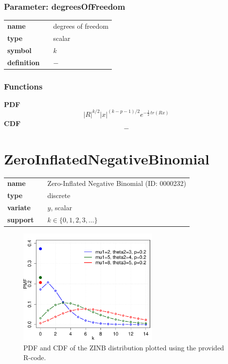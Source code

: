 \subsubsection*{Parameter: degreesOfFreedom}

\noindent\begin{tabular}{p{2cm}cl}
\textbf{name} & & degrees of freedom \\
\textbf{type} & & scalar \\
\textbf{symbol} & & $k$  \\
\textbf{definition} & & $-$
\end{tabular}
\subsubsection*{Functions}

\smallskip \noindent \hspace{.2cm} \textbf{PDF} 
\begin{equation*}|R|^{k/2}|x|^{(k-p-1)/2}e^{-\frac{1}2\,tr(Rx)}\end{equation*}
\smallskip \noindent \hspace{.2cm} \textbf{CDF} 
\begin{equation*}-\end{equation*}
\smallskip\section*{ZeroInflatedNegativeBinomial} 

  \bigskip 

\begin{tabular}{p{2cm}cl}
\textbf{name} & & Zero-Inflated Negative Binomial (ID: 0000232)\\ 
 
\textbf{type} & & discrete \\ 

\textbf{variate} & & $y$, scalar \\ 

\textbf{support} & & $k \in \{0,1,2,3,\dots\}$
\end{tabular}

\begin{figure}[htb!]
\centering
  \includegraphics[width=70mm]{pics/ZINB_pmf_cdf.pdf}
 \caption{PDF and CDF of the ZINB distribution plotted using the provided R-code.}
 \label{fig:ZINBpdfcdf}
\end{figure}

